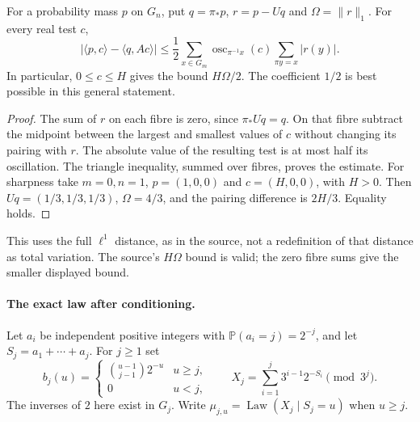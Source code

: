 \begin{proposition}
\label{prop:Mazur-centred-test}
For a probability mass $p$ on $G_n$, put $q=\pi_*p$, $r=p-Uq$ and
$\Omega=\|r\|_1$. For every real test $c$,
\begin{equation}
 |\langle p,c\rangle-\langle q,Ac\rangle|
 \le \frac12\sum_{x\in G_m}
       \operatorname{osc}_{\pi^{-1}x}(c)
       \sum_{\pi y=x}|r(y)|.
 \label{eq:Mazur-centred-test}
\end{equation}
In particular, $0\le c\le H$ gives the bound $H\Omega/2$.
The coefficient $1/2$ is best possible in this general statement.
\end{proposition}
\begin{proof}
The sum of $r$ on each fibre is zero, since $\pi_*Uq=q$.
On that fibre subtract the midpoint between the largest and smallest
values of $c$ without changing its pairing with $r$.
The absolute value of the resulting test is at most half its oscillation.
The triangle inequality, summed over fibres, proves the estimate.
For sharpness take $m=0,n=1$, $p=(1,0,0)$ and $c=(H,0,0)$,
with $H>0$. Then $Uq=(1/3,1/3,1/3)$, $\Omega=4/3$, and the
pairing difference is $2H/3$. Equality holds.
\end{proof}

This uses the full $\ell^1$ distance, as in the source, not a redefinition
of that distance as total variation. The source's $H\Omega$ bound is
valid; the zero fibre sums give the smaller displayed bound.

\paragraph{The exact law after conditioning.}
Let $a_i$ be independent positive integers with
$\mathbb P(a_i=j)=2^{-j}$, and let $S_j=a_1+\cdots+a_j$.
For $j\ge1$ set
\[
 b_j(u)=
 \begin{cases}\binom{u-1}{j-1}2^{-u}&u\ge j,\\0&u<j,\end{cases}
 \qquad
 X_j=\sum_{i=1}^j3^{i-1}2^{-S_i}\pmod{3^j}.
\]
The inverses of $2$ here exist in $G_j$.
Write $\mu_{j,u}=\operatorname{Law}(X_j\mid S_j=u)$ when $u\ge j$.

